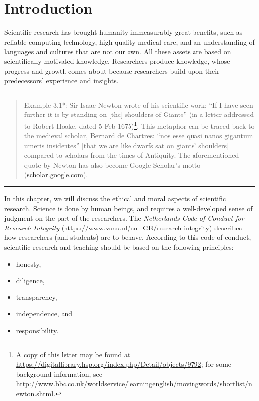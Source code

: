 \documentclass[
]{book}
\begin{document}
\hypertarget{sec:integrity-introduction}{%
\section{Introduction}\label{sec:integrity-introduction}}

Scientific research has brought humanity immeasurably great benefits, such as reliable computing technology, high-quality medical care, and an understanding of languages and cultures that are not our own. All these assets are based on scientifically motivated knowledge. Researchers produce knowledge, whose progress and growth comes about because researchers build upon their predecessors' experience and insights.

\begin{center}\rule{0.5\linewidth}{0.5pt}\end{center}

\begin{quote}
Example 3.1*: Sir Isaac Newton wrote of his scientific work: ``If I have seen further it is by standing on {[}the{]} shoulders of Giants'' (in a letter addressed to Robert Hooke, dated 5 Feb 1675)\footnote{A copy of this letter may be found at \url{https://digitallibrary.hsp.org/index.php/Detail/objects/9792}; for some background information, see \url{http://www.bbc.co.uk/worldservice/learningenglish/movingwords/shortlist/newton.shtml}.}. This metaphor can be traced back to the medieval scholar, Bernard de Chartres: ``nos esse quasi nanos gigantum umeris insidentes'' {[}that we are like dwarfs sat on giants' shoulders{]} compared to scholars from the times of Antiquity. The aforementioned quote by Newton has also become Google Scholar's motto (\url{scholar.google.com}).
\end{quote}

\begin{center}\rule{0.5\linewidth}{0.5pt}\end{center}

In this chapter, we will discuss the ethical and moral aspects of scientific research. Science is done by human beings, and requires a well-developed sense of judgment on the part of the researchers. The \emph{Netherlands Code of Conduct for Research Integrity} \citep{VSNU18}
(\url{https://www.vsnu.nl/en_GB/research-integrity}) describes how researchers (and students) are to behave. According to this code of conduct, scientific research and teaching should be based on the following principles:

\begin{itemize}
\item
  honesty,
\item
  diligence,
\item
  transparency,
\item
  independence, and
\item
  responsibility.
\end{itemize}
\end{document}
